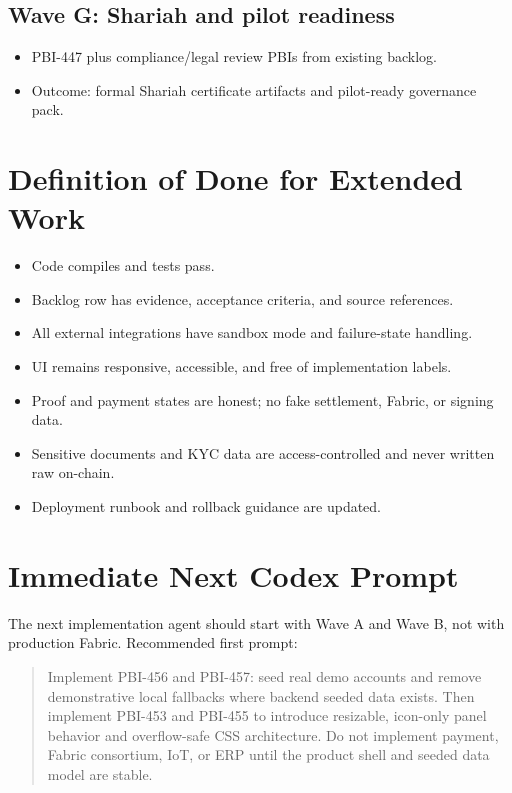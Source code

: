 \documentclass[11pt]{article}
\begin{document}
\subsection{Wave G: Shariah and pilot readiness}
\begin{itemize}
  \item PBI-447 plus compliance/legal review PBIs from existing backlog.
  \item Outcome: formal Shariah certificate artifacts and pilot-ready governance pack.
\end{itemize}

\section{Definition of Done for Extended Work}

\begin{itemize}
  \item Code compiles and tests pass.
  \item Backlog row has evidence, acceptance criteria, and source references.
  \item All external integrations have sandbox mode and failure-state handling.
  \item UI remains responsive, accessible, and free of implementation labels.
  \item Proof and payment states are honest; no fake settlement, Fabric, or signing data.
  \item Sensitive documents and KYC data are access-controlled and never written raw on-chain.
  \item Deployment runbook and rollback guidance are updated.
\end{itemize}

\section{Immediate Next Codex Prompt}

The next implementation agent should start with Wave A and Wave B, not with production Fabric. Recommended first prompt:

\begin{quote}
Implement PBI-456 and PBI-457: seed real demo accounts and remove demonstrative local fallbacks where backend seeded data exists. Then implement PBI-453 and PBI-455 to introduce resizable, icon-only panel behavior and overflow-safe CSS architecture. Do not implement payment, Fabric consortium, IoT, or ERP until the product shell and seeded data model are stable.
\end{quote}
\end{document}
